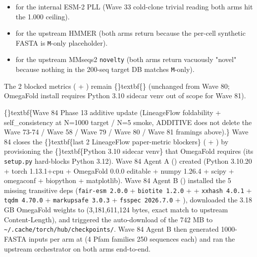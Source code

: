\documentclass{article}
\begin{document}
\begin{itemize}
\item {} for the internal ESM-2 PLL  (Wave 33 cold-clone trivial reading  both arms hit the 1.000 ceiling).
\item {} for the upstream HMMER  (both arms return  because the per-cell synthetic FASTA is \texttt{M}-only placeholder).
\item {} for the upstream MMseqs2 \texttt{novelty} (both arms return   vacuously "novel" because nothing in the 200-seq target DB matches \texttt{M}-only).
\end{itemize}
The 2 blocked metrics ( + ) remain \{\}textbf\{\} (unchanged from Wave 80; OmegaFold install requires Python 3.10 sidecar venv  out of scope for Wave 81).

\{\}textbf\{Wave 84 Phase 13 additive update (LineageFlow foldability + self\_consistency at N=1000 target / N=5 smoke, ADDITIVE  does not delete the Wave 73-74 / Wave 58 / Wave 79 / Wave 80 / Wave 81 framings above).\} Wave 84 closes the \{\}textbf\{last 2 LineageFlow paper-metric blockers\} ( + ) by provisioning the \{\}textbf\{Python 3.10 sidecar venv\} that OmegaFold requires (its \texttt{setup.py} hard-blocks Python  3.12). Wave 84 Agent A () created  (Python 3.10.20 + torch 1.13.1+cpu + OmegaFold 0.0.0 editable + numpy 1.26.4 + scipy + omegaconf + biopython + matplotlib). Wave 84 Agent B () installed the 5 missing transitive deps (\texttt{fair-esm 2.0.0} + \texttt{biotite 1.2.0} +  + \texttt{xxhash 4.0.1} + \texttt{tqdm 4.70.0} + \texttt{markupsafe 3.0.3} + \texttt{fsspec 2026.7.0} + ), downloaded the 3.18 GB OmegaFold weights to  (3,181,611,124 bytes, exact match to upstream Content-Length), and triggered the auto-download of the 742 MB  to \texttt{\textasciitilde{}/.cache/torch/hub/checkpoints/}. Wave 84 Agent B then generated 1000-FASTA inputs per arm at  (4 Pfam families  250 sequences each) and ran the upstream  orchestrator on both arms end-to-end.
\end{document}

